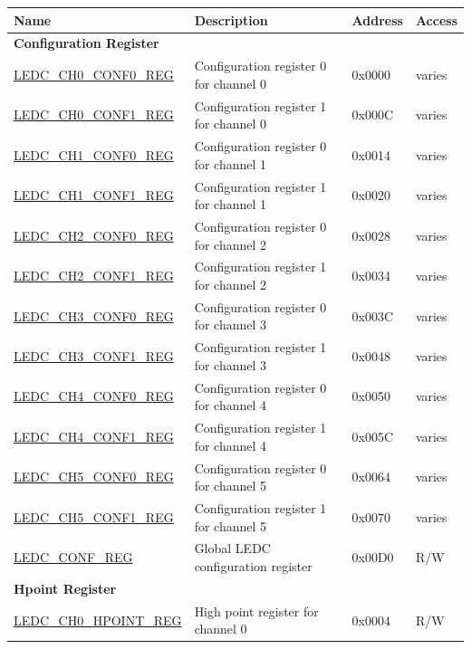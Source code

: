 \begin{longtable}{ | p{5.5cm} | p{7.2cm} | p{1.3cm} | p{1.5cm} | }
\hline\rowcolor{lightgray}
Name & Description &  Address & Access \\ \hline
\endhead
\multicolumn{4}{|l|}{\textbf{Configuration Register}} \\ \hline
\hyperref[regdesc:LEDCCHNCONF0REG]{LEDC\_CH0\_CONF0\_REG} & Configuration register 0 for channel 0 & 0x0000 & varies \\ \hline
\hyperref[regdesc:LEDCCHNCONF1REG]{LEDC\_CH0\_CONF1\_REG} & Configuration register 1 for channel 0 & 0x000C & varies \\ \hline
\hyperref[regdesc:LEDCCHNCONF0REG]{LEDC\_CH1\_CONF0\_REG} & Configuration register 0 for channel 1 & 0x0014 & varies \\ \hline
\hyperref[regdesc:LEDCCHNCONF1REG]{LEDC\_CH1\_CONF1\_REG} & Configuration register 1 for channel 1 & 0x0020 & varies \\ \hline
\hyperref[regdesc:LEDCCHNCONF0REG]{LEDC\_CH2\_CONF0\_REG} & Configuration register 0 for channel 2 & 0x0028 & varies \\ \hline
\hyperref[regdesc:LEDCCHNCONF1REG]{LEDC\_CH2\_CONF1\_REG} & Configuration register 1 for channel 2 & 0x0034 & varies \\ \hline
\hyperref[regdesc:LEDCCHNCONF0REG]{LEDC\_CH3\_CONF0\_REG} & Configuration register 0 for channel 3 & 0x003C & varies \\ \hline
\hyperref[regdesc:LEDCCHNCONF1REG]{LEDC\_CH3\_CONF1\_REG} & Configuration register 1 for channel 3 & 0x0048 & varies \\ \hline
\hyperref[regdesc:LEDCCHNCONF0REG]{LEDC\_CH4\_CONF0\_REG} & Configuration register 0 for channel 4 & 0x0050 & varies \\ \hline
\hyperref[regdesc:LEDCCHNCONF1REG]{LEDC\_CH4\_CONF1\_REG} & Configuration register 1 for channel 4 & 0x005C & varies \\ \hline
\hyperref[regdesc:LEDCCHNCONF0REG]{LEDC\_CH5\_CONF0\_REG} & Configuration register 0 for channel 5 & 0x0064 & varies \\ \hline
\hyperref[regdesc:LEDCCHNCONF1REG]{LEDC\_CH5\_CONF1\_REG} & Configuration register 1 for channel 5 & 0x0070 & varies \\ \hline
\hyperref[regdesc:LEDCCONFREG]{LEDC\_CONF\_REG} & Global LEDC configuration register & 0x00D0 & R/W \\ \hline
\multicolumn{4}{|l|}{\textbf{Hpoint Register}} \\ \hline
\hyperref[regdesc:LEDCCHNHPOINTREG]{LEDC\_CH0\_HPOINT\_REG} & High point register for channel 0 & 0x0004 & R/W \\ \hline

\end{longtable}
